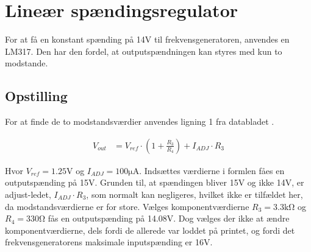 \section{Lineær spændingsregulator}\label{sec:lm317}
For at få en konstant spænding på 14\si{\volt} til frekvensgeneratoren, anvendes en LM317. Den har den fordel, at outputspændningen kan styres med kun to modstande.

\subsection{Opstilling}


For at finde de to modstandsværdier anvendes ligning 1 fra databladet \cite[Side. 10]{LM317}.

\begin{align}
	V_{out} & = V_{ref} \cdot \left( 1 + \frac{R_3}{R_4} \right) + I_{ADJ} \cdot R_3 \label{eq:lm317_formel}
\end{align}

Hvor $V_{ref} = 1.25\si{\volt}$ og $I_{ADJ} = 100\si{\micro\ampere}$. Indsættes værdierne i formlen fåes en outputspænding på 15\si{\volt}. Grunden til, at spændingen bliver 15\si{\volt} og ikke 14\si{\volt}, er adjust-ledet, $I_{ADJ} \cdot R_3$, som normalt kan negligeres, hvilket ikke er tilfældet her, da modstandsværdierne er for store. Vælges komponentværdierne $R_3 = 3.3\si{\kilo\ohm}$ og $R_4 = 330\si{\ohm}$ fås en outputspænding på 14.08\si{\volt}. Dog vælges der ikke at ændre komponentværdierne, dels fordi de allerede var loddet på printet, og fordi det frekvensgeneratorens maksimale inputspænding er 16\si{\volt}.